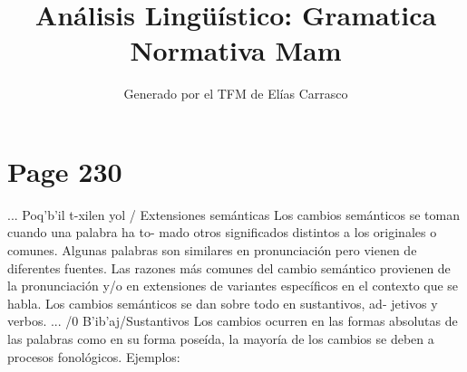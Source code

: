 \documentclass{article}%
\title{Análisis Lingüístico: Gramatica Normativa Mam}%
\author{Generado por el TFM de Elías Carrasco}%
\begin{document}
%
\normalsize%
\maketitle%
\section{Page 230}%
\label{sec:Page230}%
... Poq'b'il t{-}xilen yol / Extensiones semánticas %
Los cambios semánticos se toman cuando una palabra ha to{-} %
mado otros significados distintos a los originales o comunes. %
Algunas palabras son similares en pronunciación pero vienen %
de diferentes fuentes. %
Las razones más comunes del cambio semántico provienen de %
la pronunciación y/o en extensiones de variantes específicos %
en el contexto que se habla. %
Los cambios semánticos se dan sobre todo en sustantivos, ad{-} %
jetivos y verbos. %
... /0 B'ib'aj/Sustantivos %
Los cambios ocurren en las formas absolutas de las palabras %
como en su forma poseída, la mayoría de los cambios se deben %
a procesos fonológicos. %
Ejemplos: 

%
\end{document}
